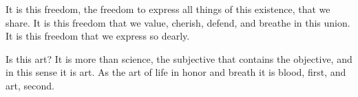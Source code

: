 

﻿It is this freedom, the freedom to express all things of this existence, that we share.  It is this freedom that we value, cherish, defend, and breathe in this union.  It is this freedom that we express so dearly.


Is this art?  It is more than science, the subjective that contains the objective, and in this sense it is art.  As the art of life in honor and breath it is blood, first, and art, second.
\bye
